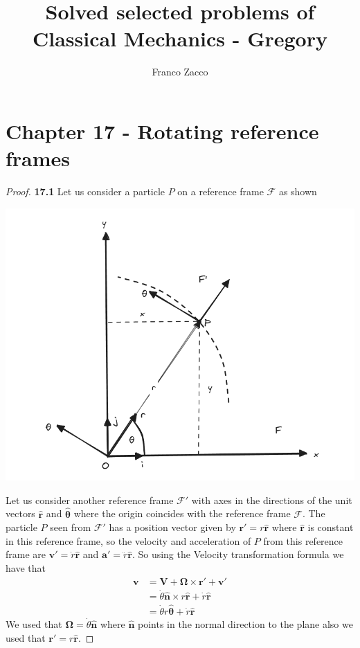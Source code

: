 \documentclass[11pt]{article}
\title{\textbf{Solved selected problems of Classical Mechanics - Gregory}}
\author{Franco Zacco}
\date{}
\newcommand{\hatr}{\bm{\hat{r}}}
\newcommand{\hatn}{\bm{\hat{n}}}
\newcommand{\hatth}{\bm{\hat{\theta}}}
\theoremstyle{definition}
\begin{document}
\maketitle
\thispagestyle{empty}

\section*{Chapter 17 - Rotating reference frames}

\begin{proof}{\textbf{17.1}}
    Let us consider a particle $P$ on a reference frame $\mathcal{F}$ as shown
    \begin{center}
        \includegraphics[scale=0.4]{ch17-1.png}
    \end{center}
    Let us consider another reference frame $\mathcal{F}'$ with axes in the
    directions of the unit vectors $\hatr$ and $\hatth$ where the origin
    coincides with the reference frame $\mathcal{F}$.
    The particle $P$ seen from $\mathcal{F}'$ has a position vector given 
    by $\bm{r}' = r \hatr$ where $\hatr$ is constant in this reference frame,
    so the velocity and acceleration of $P$ from this reference frame
    are $\bm{v}' = \dot r\hatr$ and $\bm{a}' = \ddot r\hatr$.
    So using the Velocity transformation formula we have that
    \begin{align*}
        \bm{v} &= \bm{V} + \bm\Omega \times \bm{r}' + \bm{v}'\\
            &= \dot\theta\hatn \times r \hatr + \dot r\hatr\\
            &= \dot\theta r \hatth + \dot r\hatr
    \end{align*}
    We used that $\bm\Omega = \dot\theta \hatn$ where $\hatn$ points in the
    normal direction to the plane also we used that $\bm r' = r \hatr$.


\end{proof}
\end{document}
